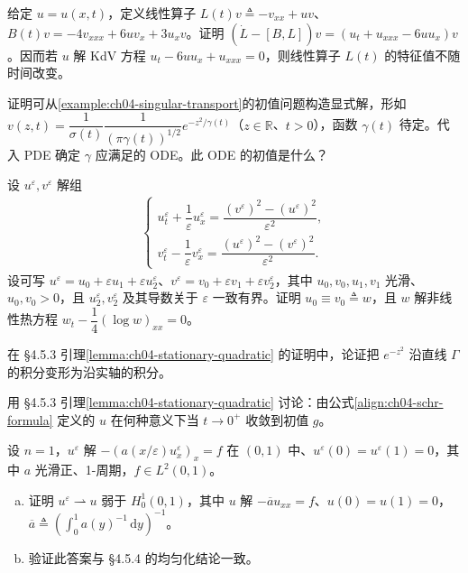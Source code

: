 \documentclass[../../main.tex]{subfiles}
\begin{document}
\begin{exercise}[续上]\label{exercise:ch04-12}给定 $u=u(x,t)$，定义线性算子 $L(t)v\triangleq-v_{xx}+uv$、$B(t)v=-4v_{xxx}+6uv_x+3u_xv$。证明 $(\dot L-[B,L])v=(u_t+u_{xxx}-6uu_x)v$。因而若 $u$ 解 KdV 方程 $u_t-6uu_x+u_{xxx}=0$，则线性算子 $L(t)$ 的特征值不随时间改变。
\end{exercise}

\begin{exercise}\label{exercise:ch04-13}
证明可从\cref{example:ch04-singular-transport}的初值问题构造显式解，形如 $v(z,t)=\dfrac{1}{\sigma(t)}\dfrac{1}{(\pi\gamma(t))^{1/2}}e^{-z^2/\gamma(t)}$（$z\in\mathbb{R}$、$t>0$），函数 $\gamma(t)$ 待定。代入 PDE 确定 $\gamma$ 应满足的 ODE。此 ODE 的初值是什么？
\end{exercise}

\begin{exercise}\label{exercise:ch04-14}
设 $u^\varepsilon,v^\varepsilon$ 解组
\begin{align*}
\begin{cases}
u_t^\varepsilon+\dfrac{1}{\varepsilon}u_x^\varepsilon=\dfrac{(v^\varepsilon)^2-(u^\varepsilon)^2}{\varepsilon^2},\\
v_t^\varepsilon-\dfrac{1}{\varepsilon}v_x^\varepsilon=\dfrac{(u^\varepsilon)^2-(v^\varepsilon)^2}{\varepsilon^2}.
\end{cases}
\end{align*}
设可写 $u^\varepsilon=u_0+\varepsilon u_1+\varepsilon u_2^\varepsilon$、$v^\varepsilon=v_0+\varepsilon v_1+\varepsilon v_2^\varepsilon$，其中 $u_0,v_0,u_1,v_1$ 光滑、$u_0,v_0>0$，且 $u_2^\varepsilon,v_2^\varepsilon$ 及其导数关于 $\varepsilon$ 一致有界。证明 $u_0\equiv v_0\triangleq w$，且 $w$ 解非线性热方程 $w_t-\dfrac{1}{4}(\log w)_{xx}=0$。
\end{exercise}

\begin{exercise}\label{exercise:ch04-15}
在 \S4.5.3 引理\cref{lemma:ch04-stationary-quadratic} 的证明中，论证把 $e^{-z^2}$ 沿直线 $\Gamma$ 的积分变形为沿实轴的积分。
\end{exercise}

\begin{exercise}\label{exercise:ch04-16}
用 \S4.5.3 引理\cref{lemma:ch04-stationary-quadratic} 讨论：由公式\eqref{align:ch04-schr-formula} 定义的 $u$ 在何种意义下当 $t\to 0^+$ 收敛到初值 $g$。
\end{exercise}

\begin{exercise}\label{exercise:ch04-17}
设 $n=1$，$u^\varepsilon$ 解 $-(a(x/\varepsilon)u_x^\varepsilon)_x=f$ 在 $(0,1)$ 中、$u^\varepsilon(0)=u^\varepsilon(1)=0$，其中 $a$ 光滑正、1-周期，$f\in L^2(0,1)$。
\begin{enumerate}[(a)]
\item 证明 $u^\varepsilon\rightharpoonup u$ 弱于 $H_0^1(0,1)$，其中 $u$ 解 $-\overline{a}u_{xx}=f$、$u(0)=u(1)=0$，$\overline{a}\triangleq\left(\int_0^1 a(y)^{-1}\,\mathrm{d}y\right)^{-1}$。
\item 验证此答案与 \S4.5.4 的均匀化结论一致。
\end{enumerate}
\end{exercise}
\end{document}

